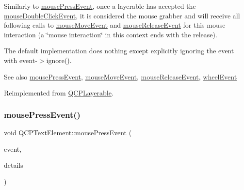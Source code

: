 Similarly to \hyperlink{class_q_c_p_text_element_ad7b2c98355e3d2f912574b74fcee0574}{mouse\+Press\+Event}, once a layerable has accepted the \hyperlink{class_q_c_p_text_element_a2272ff775ab385f612e9fd39773de7c0}{mouse\+Double\+Click\+Event}, it is considered the mouse grabber and will receive all following calls to \hyperlink{class_q_c_p_layerable_a9eee1ba47fd69be111059ca3881933e4}{mouse\+Move\+Event} and \hyperlink{class_q_c_p_text_element_acfcbaf9b1da18745e72726aafb39c855}{mouse\+Release\+Event} for this mouse interaction (a \char`\"{}mouse interaction\char`\"{} in this context ends with the release).

The default implementation does nothing except explicitly ignoring the event with {\ttfamily event-\/$>$ignore()}.

\begin{DoxySeeAlso}{See also}
\hyperlink{class_q_c_p_text_element_ad7b2c98355e3d2f912574b74fcee0574}{mouse\+Press\+Event}, \hyperlink{class_q_c_p_layerable_a9eee1ba47fd69be111059ca3881933e4}{mouse\+Move\+Event}, \hyperlink{class_q_c_p_text_element_acfcbaf9b1da18745e72726aafb39c855}{mouse\+Release\+Event}, \hyperlink{class_q_c_p_layerable_a47dfd7b8fd99c08ca54e09c362b6f022}{wheel\+Event} 
\end{DoxySeeAlso}


Reimplemented from \hyperlink{class_q_c_p_layerable_a4171e2e823aca242dd0279f00ed2de81}{Q\+C\+P\+Layerable}.

\mbox{\label{class_q_c_p_text_element_ad7b2c98355e3d2f912574b74fcee0574}} 
\subsubsection{\texorpdfstring{mouse\+Press\+Event()}{mousePressEvent()}\hspace{0.1cm}{\footnotesize\ttfamily [1/2]}}
{\footnotesize\ttfamily void Q\+C\+P\+Text\+Element\+::mouse\+Press\+Event (\begin{DoxyParamCaption}\item[{Q\+Mouse\+Event $\ast$}]{event,  }\item[{const Q\+Variant \&}]{details }\end{DoxyParamCaption})\hspace{0.3cm}{\ttfamily [virtual]}}


